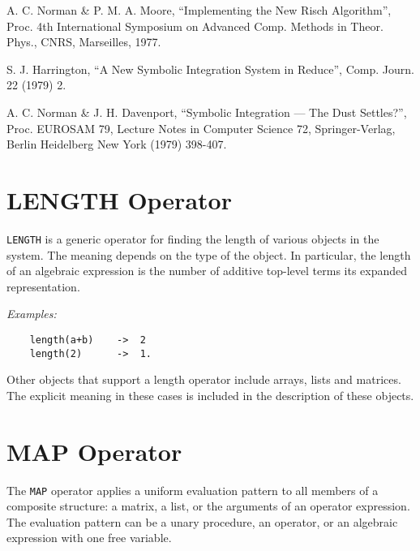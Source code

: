 	A. C. Norman \& P. M. A. Moore, ``Implementing the New Risch
		Algorithm'', Proc. 4th International Symposium on Advanced
		Comp. Methods in Theor. Phys., CNRS, Marseilles, 1977.

	S. J. Harrington, ``A New Symbolic Integration System in Reduce'',
		Comp. Journ. 22 (1979) 2.

	A. C. Norman \& J. H. Davenport, ``Symbolic Integration --- The Dust
		Settles?'', Proc. EUROSAM 79, Lecture Notes in Computer
		Science 72, Springer-Verlag, Berlin Heidelberg New York
		(1979) 398-407.

%
%
%

\section{LENGTH Operator}
{\tt LENGTH} is a generic operator for finding the
length of various objects in the system.  The meaning depends on the type
of the object.  In particular, the length of an algebraic expression is
the number of additive top-level terms its expanded representation.

{\it Examples:}
\begin{verbatim}
	length(a+b)    ->  2
	length(2)      ->  1.
\end{verbatim}
Other objects that support a length operator include arrays, lists and
matrices. The explicit meaning in these cases is included in the description
of these objects.

\section{MAP Operator}

The {\tt MAP} operator applies a uniform evaluation pattern to all members
of a composite structure: a matrix, a list, or the arguments of an
operator expression.  The evaluation pattern can be a unary procedure, an
operator, or an algebraic expression with one free variable.

